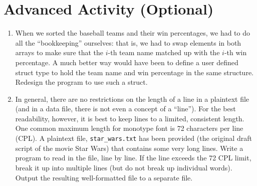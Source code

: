 \documentclass[12pt]{scrartcl}
\begin{document}
\section{Advanced Activity (Optional)}

\begin{enumerate}
  \item When we sorted the baseball teams and their win percentages, we had 
  	to do all the ``bookkeeping'' ourselves: that is, we had to swap elements 
	in both arrays to make sure that the $i$-th team name matched up with the 
	$i$-th win percentage.  A much better way would have been to define a 
	user defined struct type to hold the team name and win percentage in 
	the same structure.  Redesign the program to use such a struct.
  \item In general, there are no restrictions on the length of a line in a plaintext 
	file (and in a data file, there is not even a concept of a ``line'').  For the best 
	readability, however, it is best to keep lines to a limited, consistent length.  
	One common maximum length for monotype font is 72 characters per 
	line (CPL).  A plaintext file, \texttt{star_wars.txt} has been provided (the 
	original draft script of the movie Star Wars) that contains some very long 
	lines.  Write a program to read in the file, line by line.  If the line exceeds 
	the 72 CPL limit, break it up into multiple lines (but do not break up individual 
	words).  Output the resulting well-formatted file to a separate file.
\end{enumerate}
\end{document}
